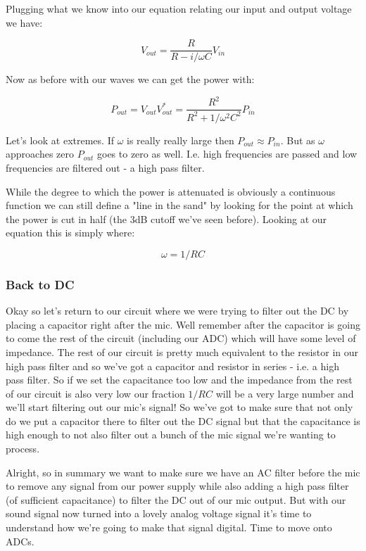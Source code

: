 \documentclass[12pt,a6paper]{book}
\begin{document}
Plugging what we know into our equation relating our input and output voltage we have:

\begin{equation}
V_{out}=\frac{R}{R - i/\omega C }V_{in}
\end{equation}

Now as before with our waves we can get the power with:

\begin{equation}
P_{out}=V_{out}V_{out}^*=\frac{R^2}{R^2+1/\omega^2 C^2}P_{in}
\end{equation}

Let's look at extremes. If $\omega$ is really really large then $P_{out}\approx P_{in}$. But as $\omega$ approaches zero $P_{out}$ goes to zero as well. I.e. high frequencies are passed and low frequencies are filtered out - a high pass filter. 

While the degree to which the power is attenuated is obviously a continuous function we can still define a "line in the sand" by looking for the point at which the power is cut in half (the 3dB cutoff we've seen before). Looking at our equation this is simply where:

\begin{equation}
\omega=1/RC
\end{equation}

\subsubsection{Back to DC}

Okay so let's return to our circuit where we were trying to filter out the DC by placing a capacitor right after the mic. Well remember after the capacitor is going to come the rest of the circuit (including our ADC) which will have some level of impedance. The rest of our circuit is pretty much equivalent to the resistor in our high pass filter and so we've got a capacitor and resistor in series - i.e. a high pass filter. So if we set the capacitance too low and the impedance from the rest of our circuit is also very low our fraction $1/RC$ will be a very large number and we'll start filtering out our mic's signal! So we've got to make sure that not only do we put a capacitor there to filter out the DC signal but that the capacitance is high enough to not also filter out a bunch of the mic signal we're wanting to process. 


Alright, so in summary we want to make sure we have an AC filter before the mic to remove any signal from our power supply while also adding a high pass filter (of sufficient capacitance) to filter the DC out of our mic output. But with our sound signal now turned into a lovely analog voltage signal it's time to understand how we're going to make that signal digital. Time to move onto ADCs.
\end{document}
